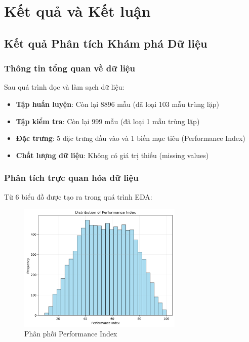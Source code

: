 \section{Kết quả và Kết luận}

\subsection{Kết quả Phân tích Khám phá Dữ liệu}

\subsubsection{Thông tin tổng quan về dữ liệu}
Sau quá trình đọc và làm sạch dữ liệu:
\begin{itemize}
	\item \textbf{Tập huấn luyện}: Còn lại 8896 mẫu (đã loại 103 mẫu trùng lặp)
	\item \textbf{Tập kiểm tra}: Còn lại 999 mẫu (đã loại 1 mẫu trùng lặp)
	\item \textbf{Đặc trưng}: 5 đặc trưng đầu vào và 1 biến mục tiêu (Performance Index)
	\item \textbf{Chất lượng dữ liệu}: Không có giá trị thiếu (missing values)
\end{itemize}

\subsubsection{Phân tích trực quan hóa dữ liệu}
Từ 6 biểu đồ được tạo ra trong quá trình EDA:

\begin{figure}[H]
	\centering
	\includegraphics[width=0.7\textwidth]{imgs/figures/figure1_performance_index_distribution.png}
	\caption{Phân phối Performance Index}
	\label{fig:performance_distribution}
\end{figure}

